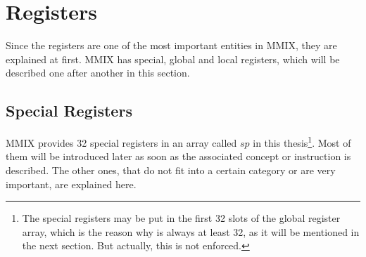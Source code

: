 \section{Registers}

Since the registers are one of the most important entities in MMIX, they are explained at first. MMIX has special, global and local registers, which will be described one after another in this section.

\subsection{Special Registers}

MMIX provides 32 special registers in an array called $sp$ in this thesis\footnote{The special registers may be put in the first 32 slots of the global register array, which is the reason why  is always at least 32, as it will be mentioned in the next section. But actually, this is not enforced.}. Most of them will be introduced later as soon as the associated concept or instruction is described. The other ones, that do not fit into a certain category or are very important, are explained here.

